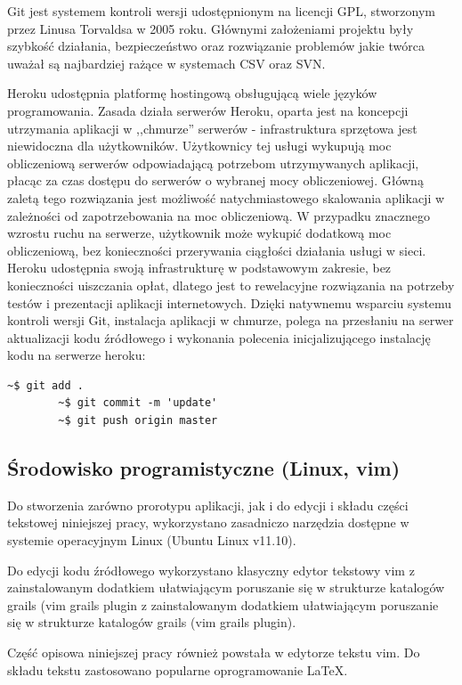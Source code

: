   Git jest systemem kontroli wersji udostępnionym na licencji GPL, stworzonym przez Linusa Torvaldsa w 2005 roku. Głównymi założeniami projektu były szybkość działania, bezpieczeństwo oraz rozwiązanie problemów jakie twórca uważał są najbardziej rażące w systemach CSV oraz SVN.

  Heroku udostępnia platformę hostingową obsługującą wiele języków programowania. Zasada działa serwerów Heroku, oparta jest na koncepcji utrzymania aplikacji w ,,chmurze'' serwerów - infrastruktura sprzętowa jest niewidoczna dla użytkowników. Użytkownicy tej usługi wykupują moc obliczeniową serwerów odpowiadającą potrzebom utrzymywanych aplikacji, płacąc za czas dostępu do serwerów o wybranej mocy obliczeniowej. Główną zaletą tego rozwiązania jest możliwość natychmiastowego skalowania aplikacji w zależności od zapotrzebowania na moc obliczeniową. W przypadku znacznego wzrostu ruchu na serwerze, użytkownik może wykupić dodatkową moc obliczeniową, bez konieczności przerywania ciągłości działania usługi w sieci. Heroku udostępnia swoją infrastrukturę w podstawowym zakresie, bez konieczności uiszczania opłat, dlatego jest to rewelacyjne rozwiązania na potrzeby testów i prezentacji aplikacji internetowych. Dzięki natywnemu wsparciu systemu kontroli wersji Git, instalacja aplikacji w chmurze, polega na przesłaniu na serwer aktualizacji kodu źródłowego i wykonania polecenia inicjalizującego instalację kodu na serwerze heroku:


        \begin{lstlisting}[caption={}, label={lst:jsCanvasEx}]
        ~$ git add .
        ~$ git commit -m 'update'
        ~$ git push origin master
        \end{lstlisting}

\subsection{Środowisko programistyczne (Linux, vim)}

  Do stworzenia zarówno prorotypu aplikacji, jak i do edycji i składu części tekstowej niniejszej pracy, wykorzystano zasadniczo narzędzia dostępne w systemie operacyjnym Linux (Ubuntu Linux v11.10). 

  Do edycji kodu źródłowego wykorzystano klasyczny edytor tekstowy vim z zainstalowanym dodatkiem ułatwiającym poruszanie się w strukturze katalogów grails (vim grails plugin z zainstalowanym dodatkiem ułatwiającym poruszanie się w strukturze katalogów grails (vim grails plugin).

  Część opisowa niniejszej pracy również powstała w edytorze tekstu vim. Do składu tekstu zastosowano popularne oprogramowanie \LaTeX. 
